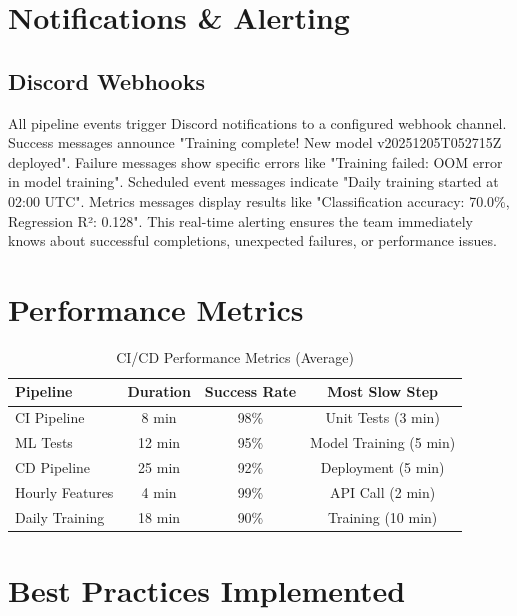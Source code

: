 \section{Notifications \& Alerting}

\subsection{Discord Webhooks}

All pipeline events trigger Discord notifications to a configured webhook channel. Success messages announce "Training complete! New model v20251205T052715Z deployed". Failure messages show specific errors like "Training failed: OOM error in model training". Scheduled event messages indicate "Daily training started at 02:00 UTC". Metrics messages display results like "Classification accuracy: 70.0\%, Regression R²: 0.128". This real-time alerting ensures the team immediately knows about successful completions, unexpected failures, or performance issues.

\section{Performance Metrics}

\begin{table}[H]
\centering
\caption{CI/CD Performance Metrics (Average)}
\begin{tabularx}{\textwidth}{lccc}
\toprule
\textbf{Pipeline} & \textbf{Duration} & \textbf{Success Rate} & \textbf{Most Slow Step} \\
\midrule
CI Pipeline & 8 min & 98\% & Unit Tests (3 min) \\
ML Tests & 12 min & 95\% & Model Training (5 min) \\
CD Pipeline & 25 min & 92\% & Deployment (5 min) \\
Hourly Features & 4 min & 99\% & API Call (2 min) \\
Daily Training & 18 min & 90\% & Training (10 min) \\
\bottomrule
\end{tabularx}
\end{table}

\section{Best Practices Implemented}

